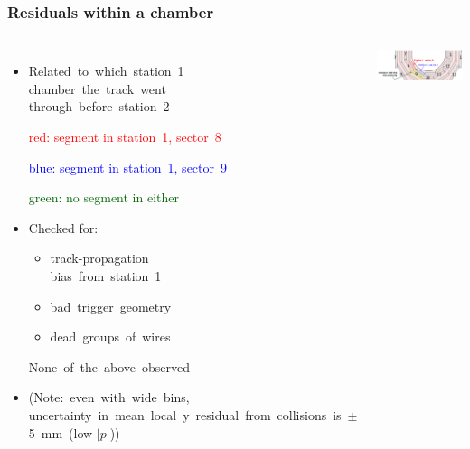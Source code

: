 \documentclass[compress]{beamer}
\begin{document}
\begin{frame}
\frametitle{Residuals within a chamber}
\begin{columns}
\begin{itemize}
\item \mbox{Related to which station~1\hspace{-5 cm}} \\ \mbox{chamber the track went\hspace{-5 cm}} \\ \mbox{through before station~2\hspace{-5 cm}}

\textcolor{red}{red: segment in station~1, sector~8}

\textcolor{blue}{blue: segment in station~1, sector~9}

\textcolor{darkgreen}{green: no segment in either}

\item Checked for:
\begin{itemize}
\item \mbox{track-propagation\hspace{-2 cm}} \\ \mbox{bias from station~1\hspace{-2 cm}}
\item \mbox{bad trigger geometry\hspace{-2 cm}}
\item \mbox{dead groups of wires\hspace{-2 cm}}
\end{itemize}

\mbox{None of the above observed\hspace{-5 cm}}

\item \mbox{(Note: even with wide bins,\hspace{-2 cm}} \\ \mbox{uncertainty in mean local y residual from collisions is $\pm$5~mm (low-$|p|$))\hspace{-15 cm}}
\end{itemize}
\includegraphics[width=\linewidth]{diagram.png}


\end{columns}
\end{frame}
\end{document}
